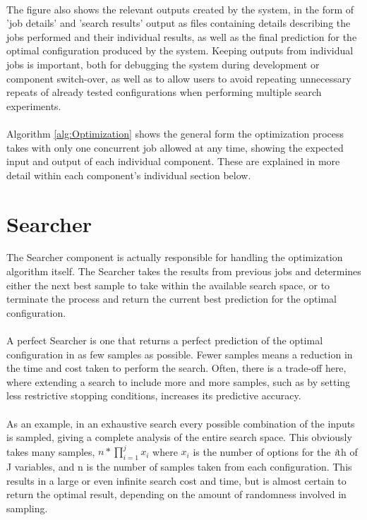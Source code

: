 \documentclass{report}
\begin{document}
\paragraph{}
The figure also shows the relevant outputs created by the system, in the form of 'job details' and 'search results' output as files containing details describing the jobs performed and their individual results, as well as the final prediction for the optimal configuration produced by the system. Keeping outputs from individual jobs is important, both for debugging the system during development or component switch-over, as well as to allow users to avoid repeating unnecessary repeats of already tested configurations when performing multiple search experiments.
\paragraph{}
Algorithm \ref{alg:Optimization} shows the general form the optimization process takes with only one concurrent job allowed at any time, showing the expected input and output of each individual component. These are explained in more detail within each component's individual section below.

\section{Searcher}
The Searcher component is actually responsible for handling the optimization algorithm itself. The Searcher takes the results from previous jobs and determines either the next best sample to take within the available search space, or to terminate the process and return the current best prediction for the optimal configuration. 

\paragraph{}
A perfect Searcher is one that returns a perfect prediction of the optimal configuration in as few samples as possible. Fewer samples means a reduction in the time and cost taken to perform the search. Often, there is a trade-off here, where extending a search to include more and more samples, such as by setting less restrictive stopping conditions, increases its predictive accuracy.

\paragraph{}
As an example, in an exhaustive search every possible combination of the inputs is sampled, giving a complete analysis of the entire search space. This obviously takes many samples, $n * \prod_{i=1}^{j} x_{i}$ where $x_{i}$ is the number of options for the \textit{i}th of J variables, and n is the number of samples taken from each configuration. This results in a large or even infinite search cost and time, but is almost certain to return the optimal result, depending on the amount of randomness involved in sampling.
\end{document}

